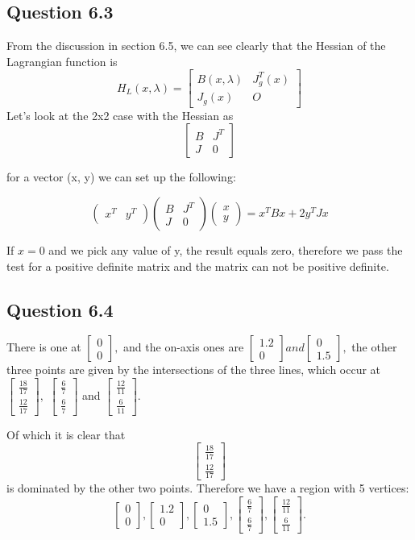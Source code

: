 \documentclass[12pt,a4paper]{report}
\newcommand{\mat}[1]{\left[ \begin{smallmatrix} #1 \end{smallmatrix} \right]}
\begin{document}
\subsection*{Question 6.3}
From the discussion in section 6.5, we can see clearly that the Hessian
of the Lagrangian function is $$H_L(x, \lambda) = 
\left[ \begin{smallmatrix} B(x, \lambda) & J_g^T(x)\\J_g(x) & O \end{smallmatrix}\right]
$$
Let's look at the 2x2 case with the Hessian as
$$\left[ \begin{smallmatrix} B & J^T \\ J & 0 \end{smallmatrix} \right]$$

for a vector (x, y) we can set up the following:

$$\left( \begin{smallmatrix} x^T & y^T \end{smallmatrix} \right)
\left( \begin{smallmatrix} B & J^T \\ J & 0 \end{smallmatrix} \right)
\left( \begin{smallmatrix} x\\y \end{smallmatrix} \right)
= x^TBx+ 2y^TJx
$$

If $x=0$ and we pick any value of y, the result equals zero, therefore we pass the test for
a positive definite matrix and the matrix can not be positive definite.

\subsection*{Question 6.4}
There is one at $\mat{0\\0},$ and the on-axis ones are $\mat{1.2\\0}$$ and $$\mat{0\\1.5},$
the other three points are given by the intersections of the three lines,
which occur at $\mat{\frac{18}{17}\\ \frac{12}{17}},$ $\mat{\frac{6}{7}\\ \frac{6}{7}}$
and $\mat{\frac{12}{11}\\ \frac{6}{11}}.$

Of which it is clear that $$\mat{\frac{18}{17}\\ \frac{12}{17}}$$ is dominated by the other
two points. Therefore we have a region with 5 vertices:
$$\mat{0\\0}, \mat{1.2\\0}, \mat{0\\1.5}, \mat{\frac{6}{7}\\ \frac{6}{7}}, \mat{\frac{12}{11}\\ \frac{6}{11}}.$$
\end{document}
